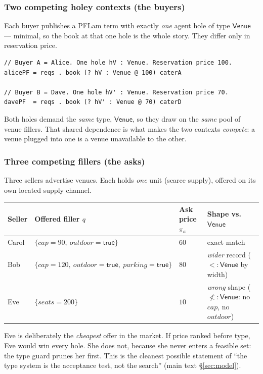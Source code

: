 \documentclass[11pt]{article}
\theoremstyle{definition}
\newcommand{\PFLam}{\textsf{PFLam}}
\newcommand{\Venue}{\textsf{Venue}}
\newcommand{\subt}{<:}
\begin{document}
\subsubsection{Two competing holey contexts (the buyers)}
Each buyer publishes a \PFLam{} term with exactly \emph{one} agent hole of type $\Venue$ --- minimal,
so the book at that one hole is the whole story. They differ only in reservation price.

\begin{lstlisting}
// Buyer A = Alice. One hole hV : Venue. Reservation price 100.
alicePF = reqs . book (? hV : Venue @ 100) caterA

// Buyer B = Dave. One hole hV' : Venue. Reservation price 70.
davePF  = reqs . book (? hV' : Venue @ 70) caterD
\end{lstlisting}

\noindent Both holes demand the \emph{same} type, $\Venue$, so they draw on the \emph{same} pool of
venue fillers. That shared dependence is what makes the two contexts \emph{compete}: a venue plugged
into one is a venue unavailable to the other.

\subsubsection{Three competing fillers (the asks)}
Three sellers advertise venues. Each holds \emph{one} unit (scarce supply), offered on its own located
supply channel.

\begin{center}\small
\renewcommand{\arraystretch}{1.2}
\begin{tabular}{@{}llll@{}}
\toprule
Seller & Offered filler $q$ & Ask price $\pi_a$ & Shape vs.\ $\Venue$ \\
\midrule
Carol & $\{\mathit{cap}{=}90,\ \mathit{outdoor}{=}\textsf{true}\}$ & $60$ & exact match \\
Bob   & $\{\mathit{cap}{=}120,\ \mathit{outdoor}{=}\textsf{true},\ \mathit{parking}{=}\textsf{true}\}$ & $80$ & \emph{wider} record ($\subt\Venue$ by width) \\
Eve   & $\{\mathit{seats}{=}200\}$ & $10$ & \emph{wrong} shape ($\not\subt\Venue$: no $\mathit{cap}$, no $\mathit{outdoor}$) \\
\bottomrule
\end{tabular}
\end{center}

\noindent Eve is deliberately the \emph{cheapest} offer in the market. If price ranked before type,
Eve would win every hole. She does not, because she never enters a feasible set: the type guard prunes
her first. This is the cleanest possible statement of ``the type system is the acceptance test, not the
search'' (main text \S\ref{sec:model}).
\end{document}
